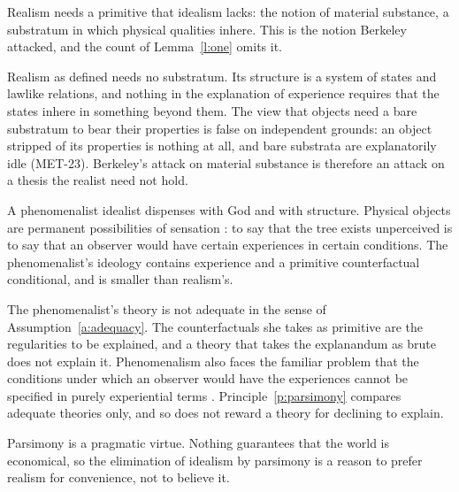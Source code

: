 \documentclass{situationist-preprint}
\begin{document}
\begin{objection}
Realism needs a primitive that idealism lacks: the notion of material substance, a substratum in which physical qualities inhere. This is the notion Berkeley attacked, and the count of Lemma~\ref{l:one} omits it.
\end{objection}

\begin{reply}
Realism as defined needs no substratum. Its structure is a system of states and lawlike relations, and nothing in the explanation of experience requires that the states inhere in something beyond them. The view that objects need a bare substratum to bear their properties is false on independent grounds: an object stripped of its properties is nothing at all, and bare substrata are explanatorily idle (MET-23). Berkeley's attack on material substance is therefore an attack on a thesis the realist need not hold.
\end{reply}

\begin{objection}[Phenomenalism]
A phenomenalist idealist dispenses with God and with structure. Physical objects are permanent possibilities of sensation \citep[ch.~11]{Mill1865}: to say that the tree exists unperceived is to say that an observer would have certain experiences in certain conditions. The phenomenalist's ideology contains experience and a primitive counterfactual conditional, and is smaller than realism's.
\end{objection}

\begin{reply}
The phenomenalist's theory is not adequate in the sense of Assumption~\ref{a:adequacy}. The counterfactuals she takes as primitive are the regularities to be explained, and a theory that takes the explanandum as brute does not explain it. Phenomenalism also faces the familiar problem that the conditions under which an observer would have the experiences cannot be specified in purely experiential terms \citep{Chisholm1948}. Principle~\ref{p:parsimony} compares adequate theories only, and so does not reward a theory for declining to explain.
\end{reply}

\begin{objection}
Parsimony is a pragmatic virtue. Nothing guarantees that the world is economical, so the elimination of idealism by parsimony is a reason to prefer realism for convenience, not to believe it.
\end{objection}
\end{document}
